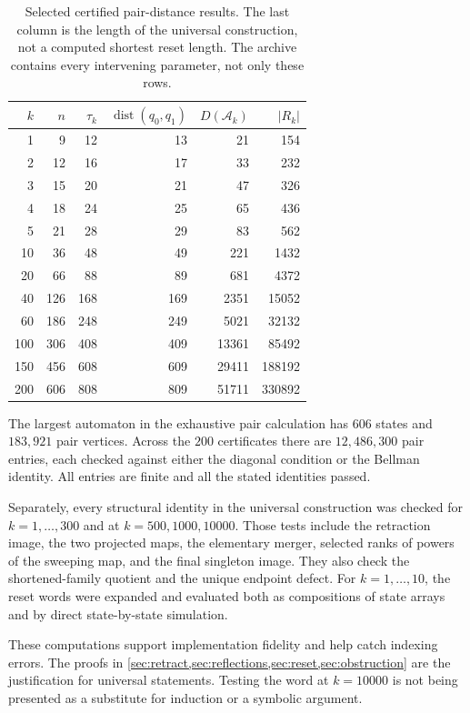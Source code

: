 \documentclass[11pt,a4paper]{article}
\numberwithin{equation}{section}
\theoremstyle{definition}
\theoremstyle{remark}
\newcommand{\Ak}{\mathcal A_k}
\newcommand{\dist}{\operatorname{dist}}
\begin{document}
\begin{table}[htbp]
\centering
\small
\begin{tabular}{rrrrrr}
\toprule
$k$&$n$&$\tau_k$&$\dist(q_0,q_1)$&$D(\Ak)$&$|R_k|$\\
\midrule
1&9&12&13&21&154\\
2&12&16&17&33&232\\
3&15&20&21&47&326\\
4&18&24&25&65&436\\
5&21&28&29&83&562\\
10&36&48&49&221&1432\\
20&66&88&89&681&4372\\
40&126&168&169&2351&15052\\
60&186&248&249&5021&32132\\
100&306&408&409&13361&85492\\
150&456&608&609&29411&188192\\
200&606&808&809&51711&330892\\
\bottomrule
\end{tabular}
\caption{Selected certified pair-distance results. The last column is the
length of the universal construction, not a computed shortest reset length.
The archive contains every intervening parameter, not only these rows.}
\label{tab:results}
\end{table}

The largest automaton in the exhaustive pair calculation has $606$ states
and $183{,}921$ pair vertices. Across the $200$ certificates there are
$12{,}486{,}300$ pair entries, each checked against either the diagonal
condition or the Bellman identity. All entries are finite and all the stated
identities passed.

Separately, every structural identity in the universal construction was
checked for $k=1,\ldots,300$ and at $k=500,1000,10000$. Those tests include
the retraction image, the two projected maps, the elementary merger, selected
ranks of powers of the sweeping map, and the final singleton image. They
also check the shortened-family quotient and the unique endpoint defect.
For $k=1,\ldots,10$, the reset words were expanded and evaluated both as
compositions of state arrays and by direct state-by-state simulation.

These computations support implementation fidelity and help catch indexing
errors. The proofs in \cref{sec:retract,sec:reflections,sec:reset,sec:obstruction}
are the justification for universal statements. Testing the word at
$k=10000$ is not being presented as a substitute for induction or a symbolic
argument.
\end{document}
